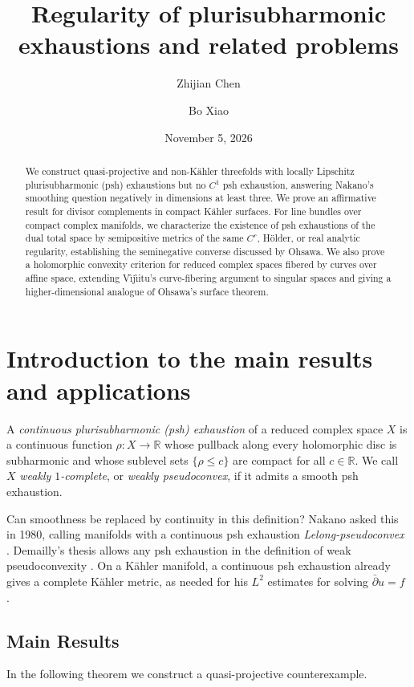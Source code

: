 \documentclass[11pt]{amsart}
\title[Regularity of plurisubharmonic exhaustions]{Regularity of
plurisubharmonic exhaustions and related problems}
\author{Zhijian Chen}
\author{Bo Xiao}
\date{November 5, 2026}
\theoremstyle{definition}
\theoremstyle{remark}
\numberwithin{equation}{section}
\newcommand{\R}{\mathbb R}
\newcommand{\barp}{\bar\partial}
\begin{document}
\begin{abstract}
We construct quasi-projective and non-K\"ahler threefolds with locally
Lipschitz plurisubharmonic (psh) exhaustions but no $C^1$ psh exhaustion,
answering Nakano's smoothing question negatively in dimensions at least
three. We prove an affirmative result for divisor complements in compact
K\"ahler surfaces. For line bundles over compact complex manifolds, we
characterize the existence of psh exhaustions of the dual total space by
semipositive metrics of the same $C^r$, H\"older, or real analytic
regularity, establishing the seminegative converse discussed by Ohsawa.
We also prove a holomorphic convexity criterion for reduced complex
spaces fibered by curves over affine space, extending
V\^{\i}j\^{\i}itu's curve-fibering argument to singular spaces and giving
a higher-dimensional analogue of Ohsawa's surface theorem.
\end{abstract}
\maketitle
\tableofcontents

\section{Introduction to the main results and applications}\label{sec:intro}

A \emph{continuous plurisubharmonic (psh) exhaustion} of a reduced complex space
$X$ is a continuous function $\rho:X\to\R$ whose pullback along every
holomorphic disc is subharmonic and whose sublevel sets $\{\rho\le c\}$
are compact for all $c\in\R$. We call $X$ \emph{weakly $1$-complete},
or \emph{weakly pseudoconvex}, if it admits a smooth psh exhaustion.

Can smoothness be replaced by continuity in this definition?
Nakano asked this in 1980, calling manifolds with a continuous
psh exhaustion \emph{Lelong-pseudoconvex}
\cite[\S I.1, Problem~1, p.~162]{Wakabayashi1980}. Demailly's thesis
allows any psh exhaustion in the definition of weak pseudoconvexity
\cite[Introduction, \S1, p.~3]{Demailly1982}. On a K\"ahler manifold,
a continuous psh exhaustion already gives a complete K\"ahler metric,
as needed for his $L^2$ estimates for solving $\barp u=f$
\cite[Theorems~1.3 and~4.1]{DemaillyL2}.

\subsection{Main Results}
In the following theorem we construct a quasi-projective counterexample.
\end{document}

